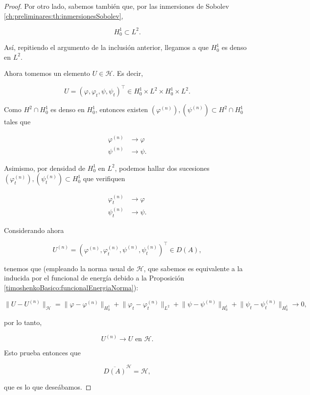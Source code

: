 \begin{proof}
    Por otro lado, sabemos también que, por las inmersiones de Sobolev \ref{ch:preliminares:th:inmersionesSobolev},

    \[H_0^1 \subset L^2.\]

    Así, repitiendo el argumento de la inclusión anterior, llegamos a que $H_0^1$ es denso en $L^2$.

    Ahora tomemos un elemento $U \in \mathcal{H}$. Es decir,

    \[U = (\varphi, \varphi_t, \psi, \psi_t)^\top \in H_0^1 \times L^2 \times H_0^1 \times L^2.\]

    Como $H^2 \cap H_0^1$ es denso en $H_0^1$, entonces existen $(\varphi^{(n)}), (\psi^{(n)}) \subset H^2 \cap H_0^1$ tales que

    \begin{align*}
        \varphi^{(n)} &\rightarrow \varphi\\
        \psi^{(n)} & \rightarrow \psi.
    \end{align*}

    Asimismo, por densidad de $H_0^1$ en $L^2$, podemos hallar dos sucesiones $(\varphi_t^{(n)}), (\psi_t^{(n)}) \subset H_0^1$ que verifiquen

    \begin{align*}
        \varphi_t^{(n)} &\rightarrow \varphi\\
        \psi_t^{(n)} & \rightarrow \psi.
    \end{align*}

    Considerando ahora 
    
    \[U^{(n)} = (\varphi^{(n)}, \varphi_t^{(n)}, \psi^{(n)}, \psi_t^{(n)})^\top \in D(A),\]

    tenemos que (empleando la norma usual de $\mathcal{H}$, que sabemos es equivalente a la inducida por el funcional de energía debido a la Proposición \ref{timoshenkoBasico:funcionalEnergiaNorma}):

    \[\lVert U - U^{(n)}\rVert_{\mathcal{H}} = \lVert \varphi - \varphi^{(n)}\rVert_{H_0^1} + \lVert \varphi_t - \varphi_t^{(n)}\rVert_{L^2} + \lVert \psi - \psi^{(n)}\rVert_{H_0^1} + \lVert \psi_t - \psi_t^{(n)}\rVert_{H_0^1} \rightarrow 0,\]

    por lo tanto,

    \[U^{(n)} \rightarrow U \text{ en } \mathcal{H}.\]

    Esto prueba entonces que 

    \[\overline{D(A)}^{\mathcal{H}} = \mathcal{H},\]

    que es lo que deseábamos.
\end{proof}

